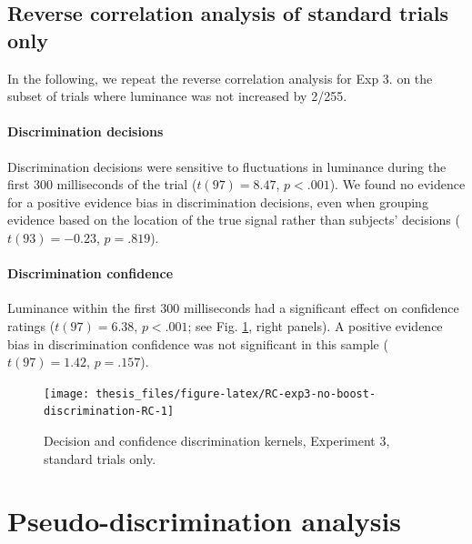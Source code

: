 \documentclass[12pt,twoside]{reedthesis}
\begin{document}
\hypertarget{appRC:standardonly}{%
\subsection{Reverse correlation analysis of standard trials only}\label{appRC:standardonly}}

In the following, we repeat the reverse correlation analysis for Exp 3. on the subset of trials where luminance was not increased by 2/255.

\hypertarget{discrimination-decisions-2}{%
\paragraph{Discrimination decisions}\label{discrimination-decisions-2}}

Discrimination decisions were sensitive to fluctuations in luminance during the first 300 milliseconds of the trial (\(t(97) = 8.47\), \(p < .001\)). We found no evidence for a positive evidence bias in discrimination decisions, even when grouping evidence based on the location of the true signal rather than subjects' decisions (\(t(93) = -0.23\), \(p = .819\)).

\hypertarget{discrimination-confidence-2}{%
\paragraph{Discrimination confidence}\label{discrimination-confidence-2}}

Luminance within the first 300 milliseconds had a significant effect on confidence ratings (\(t(97) = 6.38\), \(p < .001\); see Fig. \ref{fig:RC-exp3-no-boost-discrimination-RC}, right panels). A positive evidence bias in discrimination confidence was not significant in this sample (\(t(97) = 1.42\), \(p = .157\)).


\begin{figure}
\texttt{[image: thesis\_files/figure-latex/RC-exp3-no-boost-discrimination-RC-1]} \caption[Decision kernels in discrimination, Exp. 3]{Decision and confidence discrimination kernels, Experiment 3, standard trials only.}\label{fig:RC-exp3-no-boost-discrimination-RC}
\end{figure}
\hypertarget{appRC:PDRC}{%
\section{Pseudo-discrimination analysis}\label{appRC:PDRC}}
\end{document}
